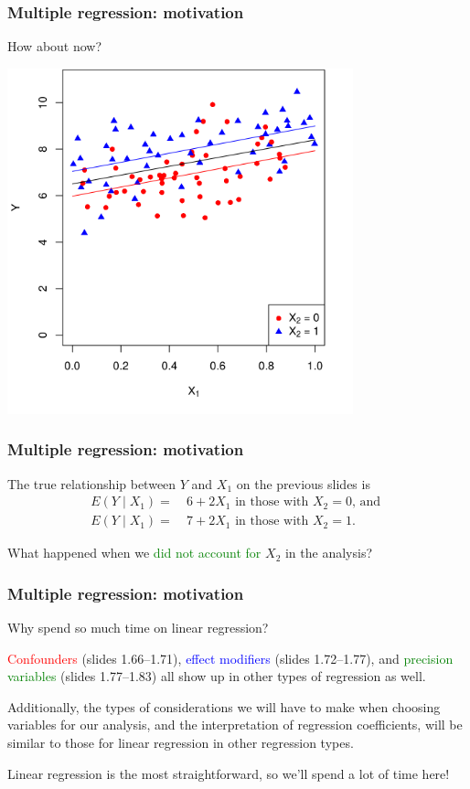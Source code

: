 \documentclass[12pt, 
hyperref={colorlinks=true, linkcolor=blue, urlcolor=cyan}]{beamer}
\begin{document}
\begin{frame}
\frametitle{Multiple regression: motivation}
How about now?

\centering
\includegraphics[width=0.75\textwidth]{plots/precision_colored_with_multiple_lines.png}
\end{frame}

\begin{frame}
\frametitle{Multiple regression: motivation}
The true relationship between $Y$ and $X_1$ on the previous slides is 
\begin{align*}
E(Y \mid X_1) =& \ 6 + 2 X_1 \text{ in those with $X_2 = 0$, and } \\
E(Y \mid X_1) =& \ 7 + 2 X_1 \text{ in those with $X_2 = 1$}.
\end{align*}

What happened when we \textcolor{green}{did not account for} $X_2$ in the analysis? 
\end{frame}

\begin{frame}
\frametitle{Multiple regression: motivation}
Why spend so much time on linear regression?

\textcolor{red}{Confounders} (slides 1.66--1.71), \textcolor{blue}{effect modifiers} (slides 1.72--1.77), and \textcolor{green}{precision variables} (slides 1.77--1.83) all show up in other types of regression as well.

Additionally, the types of considerations we will have to make when choosing variables for our analysis, and the interpretation of regression coefficients, will be similar to those for linear regression in other regression types.

Linear regression is the most straightforward, so we'll spend a lot of time here!
\end{frame}
\end{document}

